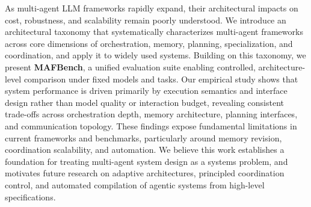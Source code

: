 As multi-agent LLM frameworks rapidly expand, their architectural impacts on cost, robustness, and scalability remain poorly understood. 
%
We introduce an architectural taxonomy that systematically characterizes multi-agent frameworks across core dimensions of orchestration, memory, planning, specialization, and coordination, and apply it to widely used systems. Building on this taxonomy, we present \textbf{MAFBench}, a unified evaluation suite enabling controlled, architecture-level comparison under fixed models and tasks. Our empirical study shows that system performance is driven primarily by execution semantics and interface design rather than model quality or interaction budget, revealing consistent trade-offs across orchestration depth, memory architecture, planning interfaces, and communication topology. 
%
These findings expose fundamental limitations in current frameworks and benchmarks, particularly around memory revision, coordination scalability, and automation. We believe this work establishes a foundation for treating multi-agent system design as a systems problem, and motivates future research on adaptive architectures, principled coordination control, and automated compilation of agentic systems from high-level specifications.